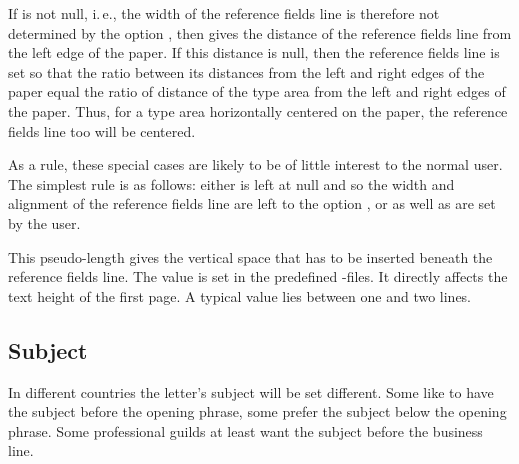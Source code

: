 If  is not null, i.\,e., the width of the reference fields
line is therefore not determined by the option , then
 gives the distance of the reference fields line from the
left edge of the paper. If this distance is null, then
the reference fields line is set so that the ratio between its distances from
the left and right edges of the paper equal the ratio of distance of the type
area from the left and right edges of the paper. Thus, for a type area
horizontally centered on the paper, the reference fields line too will be
centered.

As a rule, these special cases are likely to be of little interest to the
normal user. The simplest rule is as follows: either
 is left at null and so the width and alignment of the
reference fields line are left to the option
, or  as well as
 are set by the user.%
%
\EndIndexGroup


\begin{Declaration}
\end{Declaration}
This pseudo-length gives the vertical space that has to be inserted beneath
the reference fields line. The value is set in the predefined
-files. It
directly affects the text height of the first page. A typical value lies
between one and two lines.%
%
\EndIndexGroup
%
\EndIndexGroup


\subsection{Subject}
%
\BeginIndexGroup
{}

In different countries the letter's subject will be set different. Some like
to have the subject before the opening phrase, some prefer the subject below
the opening phrase. Some professional guilds at least want the subject before
the business line.

